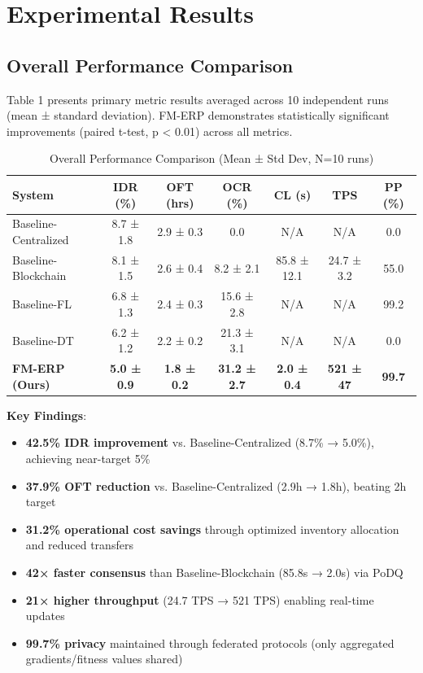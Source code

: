 \documentclass[times,10pt,twocolumn]{jucs2e}
\begin{document}

\section{Experimental Results}

\subsection{Overall Performance Comparison}

Table 1 presents primary metric results averaged across 10 independent runs (mean ± standard deviation). FM-ERP demonstrates statistically significant improvements (paired t-test, p < 0.01) across all metrics.

\begin{table}[h!]
\centering
\caption{Overall Performance Comparison (Mean ± Std Dev, N=10 runs)}
\begin{tabular}{lcccccc}
\toprule
\textbf{System} & \textbf{IDR (\%)} & \textbf{OFT (hrs)} & \textbf{OCR (\%)} & \textbf{CL (s)} & \textbf{TPS} & \textbf{PP (\%)} \\
\midrule
Baseline-Centralized & 8.7 ± 1.8 & 2.9 ± 0.3 & 0.0 & N/A & N/A & 0.0 \\
Baseline-Blockchain & 8.1 ± 1.5 & 2.6 ± 0.4 & 8.2 ± 2.1 & 85.8 ± 12.1 & 24.7 ± 3.2 & 55.0 \\
Baseline-FL & 6.8 ± 1.3 & 2.4 ± 0.3 & 15.6 ± 2.8 & N/A & N/A & 99.2 \\
Baseline-DT & 6.2 ± 1.2 & 2.2 ± 0.2 & 21.3 ± 3.1 & N/A & N/A & 0.0 \\
\midrule
\textbf{FM-ERP (Ours)} & \textbf{5.0 ± 0.9} & \textbf{1.8 ± 0.2} & \textbf{31.2 ± 2.7} & \textbf{2.0 ± 0.4} & \textbf{521 ± 47} & \textbf{99.7} \\
\bottomrule
\end{tabular}
\end{table}

\textbf{Key Findings}:
\begin{itemize}
\item \textbf{42.5\% IDR improvement} vs. Baseline-Centralized (8.7\% → 5.0\%), achieving near-target 5\%
\item \textbf{37.9\% OFT reduction} vs. Baseline-Centralized (2.9h → 1.8h), beating 2h target
\item \textbf{31.2\% operational cost savings} through optimized inventory allocation and reduced transfers
\item \textbf{42× faster consensus} than Baseline-Blockchain (85.8s → 2.0s) via PoDQ
\item \textbf{21× higher throughput} (24.7 TPS → 521 TPS) enabling real-time updates
\item \textbf{99.7\% privacy} maintained through federated protocols (only aggregated gradients/fitness values shared)
\end{itemize}
\end{document}

